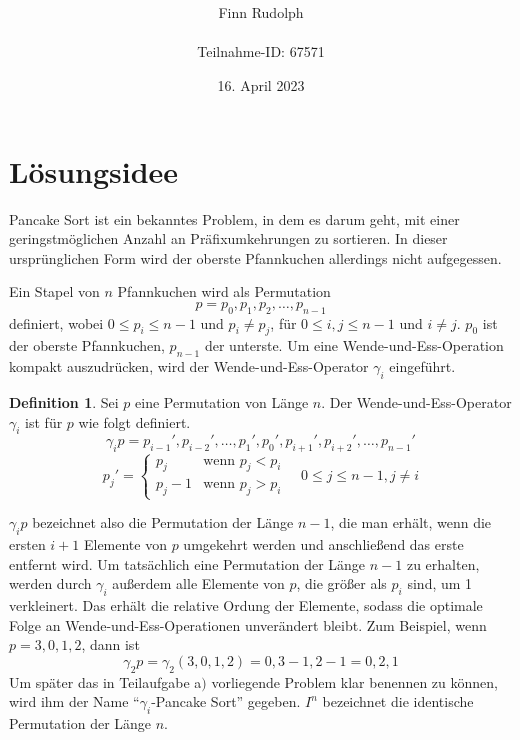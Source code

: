 \documentclass[a4paper, 10pt, ngerman]{article}
\title{\LARGE \textbf{\Aufgabe}}
\author{\large Finn Rudolph \\ \\ \large Teilnahme-ID: 67571}
\date{\large 16. April 2023}
\begin{document}
\begin{titlepage}
    \maketitle
    \tableofcontents
    \thispagestyle{empty}
\end{titlepage}

\newtheorem{theorem}{Satz}
\newtheorem{lemma}{Lemma}
\theoremstyle{definition}
\newtheorem{definition}{Definition}

\section{Lösungsidee}

Pancake Sort ist ein bekanntes Problem, in dem es darum geht, mit einer geringstmöglichen Anzahl an Präfixumkehrungen zu sortieren. In dieser ursprünglichen Form wird der oberste Pfannkuchen allerdings nicht aufgegessen.

Ein Stapel von $n$ Pfannkuchen wird als Permutation
$$
    p = p_0, p_1, p_2, \dots, p_{n - 1}
$$
definiert, wobei $0 \le p_i \le n-1$ und $p_i \ne p_j$, für $0 \le i, j \le n-1$ und $i \ne j$. $p_0$ ist der oberste Pfannkuchen, $p_{n - 1}$ der unterste. Um eine Wende-und-Ess-Operation kompakt auszudrücken, wird der Wende-und-Ess-Operator $\gamma_i$ eingeführt.

\begin{definition}
    Sei $p$ eine Permutation von Länge $n$. Der Wende-und-Ess-Operator $\gamma_i$ ist für $p$ wie folgt definiert.
    $$
        \gamma_i p = p_{i-1}', p_{i-2}', \dots, p_1', p_0', p_{i+1}', p_{i+2}', \dots, p_{n-1}'
    $$
    $$
        p_j' = \begin{cases}
            p_j     & \text{wenn } p_j < p_i \\
            p_j - 1 & \text{wenn } p_j > p_i
        \end{cases}
        \quad 0 \le j \le n - 1, j \ne i
    $$
\end{definition}

$\gamma_i p$ bezeichnet also die Permutation der Länge $n - 1$, die man erhält, wenn die ersten $i+1$ Elemente von $p$ umgekehrt werden und anschließend das erste entfernt wird. Um tatsächlich eine Permutation der Länge $n - 1$ zu erhalten, werden durch $\gamma_i$ außerdem alle Elemente von $p$, die größer als $p_i$ sind, um 1 verkleinert. Das erhält die relative Ordung der Elemente, sodass die optimale Folge an Wende-und-Ess-Operationen unverändert bleibt. Zum Beispiel, wenn $p = 3, 0, 1, 2$, dann ist
$$
    \gamma_2 p = \gamma_2 (3, 0, 1, 2) = 0, 3 - 1, 2 - 1 = 0, 2, 1
$$
Um später das in Teilaufgabe a$)$ vorliegende Problem klar benennen zu können, wird ihm der Name ``$\gamma_i$-Pancake Sort'' gegeben. $I^n$ bezeichnet die identische Permutation der Länge $n$.
\end{document}
